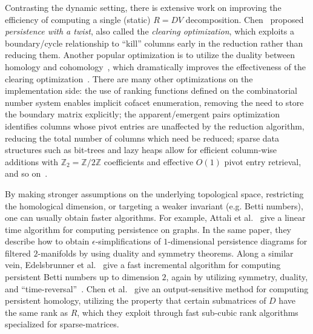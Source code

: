 \documentclass[sn-mathphys]{sn-jnl}
\begin{document}
Contrasting the dynamic setting, there is extensive work  on improving the efficiency of computing a single (static) $R = DV$ decomposition. Chen~\cite{chen2011persistent} proposed \emph{persistence with a twist}, also called the \emph{clearing optimization}, which exploits a boundary/cycle relationship to ``kill'' columns early in the reduction rather than reducing them. 
Another popular optimization is to utilize the duality between   homology and cohomology~\cite{de2011dualities}, which dramatically improves the effectiveness of the clearing optimization~\cite{bauer2021ripser}. 
There are many other optimizations on the implementation side: the use of ranking functions defined on the combinatorial number system enables implicit cofacet enumeration, removing the need to store the boundary matrix explicitly; the apparent/emergent pairs optimization identifies columns whose pivot entries are unaffected by the reduction algorithm, reducing the total number of columns which need be reduced; sparse data structures such as bit-trees and lazy heaps allow for efficient column-wise additions with $\mathbb{Z}_2 = \mathbb{Z}/2\mathbb{Z}$ coefficients and effective $O(1)$ pivot entry retrieval, and so on~\cite{bauer2021ripser, bauer2017phat}. 

By making stronger assumptions on the underlying topological space, restricting the homological dimension, or targeting  a weaker invariant (e.g. Betti numbers), one can usually obtain faster algorithms.
For example, Attali et al.~\cite{attali2009persistence} give a linear time algorithm for computing persistence on graphs.
In the same paper, they describe how to obtain $\epsilon$-simplifications of $1$-dimensional persistence diagrams for filtered $2$-manifolds by using duality and symmetry theorems. 
Along a similar vein, Edelsbrunner et al.~\cite{edelsbrunner2000topological} give a fast incremental algorithm for computing persistent Betti numbers up to dimension $2$, again by utilizing symmetry, duality, and ``time-reversal''~\cite{delfinado1995incremental}. Chen et al.~\cite{chen2013output} give an output-sensitive method for computing persistent homology,  utilizing the property that certain submatrices of  $D$ have the same rank as  $R$, which they exploit through fast sub-cubic rank algorithms specialized for sparse-matrices.  
\end{document}
